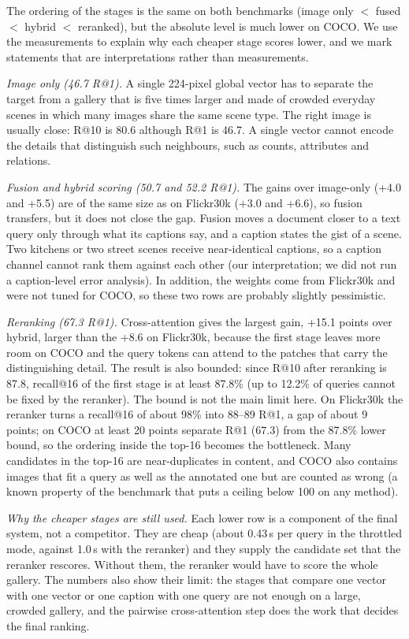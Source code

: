 \documentclass[conference]{IEEEtran}
\begin{document}
The ordering of the stages is the same on both benchmarks (image only $<$ fused $<$ hybrid $<$ reranked), but
the absolute level is much lower on COCO. We use the measurements to explain why each cheaper stage scores
lower, and we mark statements that are interpretations rather than measurements.

\emph{Image only (46.7 R@1).} A single 224-pixel global vector has to separate the target from a gallery that
is five times larger and made of crowded everyday scenes in which many images share the same scene type.
The right image is usually close: R@10 is 80.6 although R@1 is 46.7. A single vector cannot encode the details
that distinguish such neighbours, such as counts, attributes and relations.

\emph{Fusion and hybrid scoring (50.7 and 52.2 R@1).} The gains over image-only (+4.0 and +5.5) are of the
same size as on Flickr30k (+3.0 and +6.6), so fusion transfers, but it does not close the gap. Fusion
moves a document closer to a text query only through what its captions say, and a caption states the gist of
a scene. Two kitchens or two street scenes receive near-identical captions, so a caption channel cannot rank
them against each other (our interpretation; we did not run a caption-level error analysis). In addition, the
weights come from Flickr30k and were not tuned for COCO, so these two rows are probably slightly pessimistic.

\emph{Reranking (67.3 R@1).} Cross-attention gives the largest gain, +15.1 points over hybrid, larger than
the +8.6 on Flickr30k, because the first stage leaves more room on COCO and the query tokens can attend to
the patches that carry the distinguishing detail. The result is also bounded: since R@10 after reranking
is 87.8, recall@16 of the first stage is at least 87.8\% (up to 12.2\% of queries cannot be fixed by the reranker).
The bound is not the main limit here. On Flickr30k the reranker turns a recall@16 of about 98\% into 88--89 R@1,
a gap of about 9 points; on COCO at least 20 points separate R@1 (67.3) from the 87.8\% lower bound, so the
ordering inside the top-16 becomes the bottleneck. Many candidates in the top-16 are near-duplicates in
content, and COCO also contains images that fit a query as well as the annotated one but are counted as wrong
(a known property of the benchmark that puts a ceiling below 100 on any method).

\emph{Why the cheaper stages are still used.} Each lower row is a component of the final system, not a
competitor. They are cheap (about 0.43\,s per query in the throttled mode, against 1.0\,s with the reranker)
and they supply the candidate set that the reranker rescores. Without them, the reranker would have to score
the whole gallery. The numbers also show their limit: the stages that compare one vector with one vector or
one caption with one query are not enough on a large, crowded gallery, and the pairwise cross-attention step
does the work that decides the final ranking.
\end{document}

